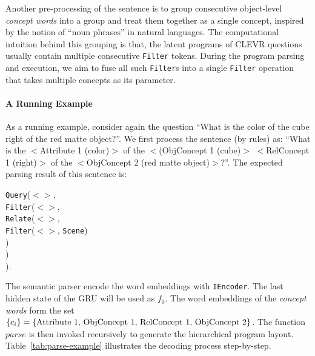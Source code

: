\documentclass{article} \usepackage{iclr2019_conference,times}
\newcommand{\tbl}[1]{Table~\ref{#1}}
\begin{document}
Another pre-processing of the sentence is to group consecutive object-level {\it concept words} into a group and treat them together as a single concept, inspired by the notion of ``noun phrases'' in natural languages. The computational intuition behind this grouping is that, the latent programs of CLEVR questions usually contain multiple consecutive \texttt{Filter} tokens. During the program parsing and execution, we aim to fuse all such \texttt{Filter}s into a single \texttt{Filter} operation that takes multiple concepts as its parameter.

\paragraph{A Running Example}
As a running example, consider again the question ``What is the color of the cube right of the red matte object?''. We first process the sentence (by rules) as:
``What is the $<$Attribute 1 (color)$>$ of the $<$(ObjConcept 1 (cube)$>$ $<$RelConcept 1 (right)$>$ of the  $<$ObjConcept 2 (red matte object)$>$?''. The expected parsing result of this sentence is:

\begin{adjustwidth}{4em}{0em}
\texttt{Query}($<$$>$,\\
\hspace*{1cm} \texttt{Filter}($<$$>$,\\
\hspace*{2cm} \texttt{Relate}($<$$>$,\\
\hspace*{3cm} \texttt{Filter}($<$$>$, \texttt{Scene})\\
\hspace*{2cm})\\
\hspace*{1cm})\\
).
\end{adjustwidth}

The semantic parser encode the word embeddings with {\tt IEncoder}. The last hidden state of the GRU will be used as $f_0$. The word embeddings of the {\it concept words} form the set $\{c_i\} = \{\textnormal{Attribute 1, ObjConcept 1, RelConcept 1, ObjConcept 2}\}$. The function $parse$ is then invoked recursively to generate the hierarchical program layout. \tbl{tab:parse-example} illustrates the decoding process step-by-step.
\end{document}
